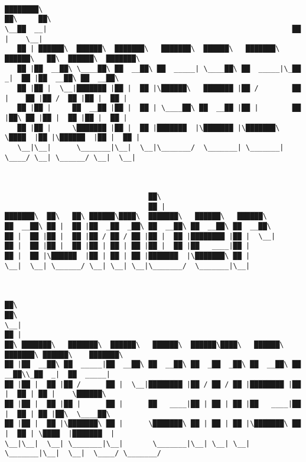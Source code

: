 \documentclass[varwidth=\maxdimen,margin=0.5cm,multi={verbatim}]{standalone}
\begin{document}
\begin{verbatim}

████████\                                                           ██\     ██\
\__██  __|                                                          ██ |    \__|
   ██ | ██████\  ██████\  ███████\   ███████\  ██████\   ███████\ ██████\   ██\  ██████\  ███████\
   ██ |██  __██\ \____██\ ██  __██\ ██  _____| \____██\ ██  _____|\_██  _|  ██ |██  __██\ ██  __██\
   ██ |██ |  \__|███████ |██ |  ██ |\██████\   ███████ |██ /        ██ |    ██ |██ /  ██ |██ |  ██ |
   ██ |██ |     ██  __██ |██ |  ██ | \____██\ ██  __██ |██ |        ██ |██\ ██ |██ |  ██ |██ |  ██ |
   ██ |██ |     \███████ |██ |  ██ |███████  |\███████ |\███████\   \████  |██ |\██████  |██ |  ██ |
   \__|\__|      \_______|\__|  \__|\_______/  \_______| \_______|   \____/ \__| \______/ \__|  \__|



                                  ██\
                                  ██ |
███████\  ██\   ██\ ██████\████\  ███████\   ██████\   ██████\
██  __██\ ██ |  ██ |██  _██  _██\ ██  __██\ ██  __██\ ██  __██\
██ |  ██ |██ |  ██ |██ / ██ / ██ |██ |  ██ |████████ |██ |  \__|
██ |  ██ |██ |  ██ |██ | ██ | ██ |██ |  ██ |██   ____|██ |
██ |  ██ |\██████  |██ | ██ | ██ |███████  |\███████\ ██ |
\__|  \__| \______/ \__| \__| \__|\_______/  \_______|\__|



██\                                                                            ██\
\__|                                                                           ██ |
██\ ███████\   ███████\  ██████\   ██████\  ██████\████\   ██████\  ███████\ ██████\    ███████\
██ |██  __██\ ██  _____|██  __██\ ██  __██\ ██  _██  _██\ ██  __██\ ██  __██\\_██  _|  ██  _____|
██ |██ |  ██ |██ /      ██ |  \__|████████ |██ / ██ / ██ |████████ |██ |  ██ | ██ |    \██████\
██ |██ |  ██ |██ |      ██ |      ██   ____|██ | ██ | ██ |██   ____|██ |  ██ | ██ |██\  \____██\
██ |██ |  ██ |\███████\ ██ |      \███████\ ██ | ██ | ██ |\███████\ ██ |  ██ | \████  |███████  |
\__|\__|  \__| \_______|\__|       \_______|\__| \__| \__| \_______|\__|  \__|  \____/ \_______/



\end{verbatim}
\end{document}
